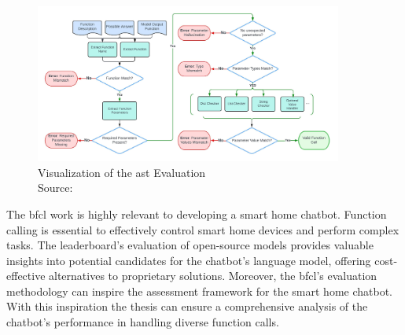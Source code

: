\begin{figure}[h]
  \centering
  \captionsetup{justification=centering}
  \includegraphics[width=0.9\textwidth]{graphics/bfcl-ast.jpeg}
  \caption{Visualization of the \gls{ast} Evaluation\\Source: \citet{berkeley-function-calling-leaderboard}}
  \label{fig:ast}
\end{figure}

The \gls{bfcl} work is highly relevant to developing a smart home chatbot. 
Function calling is essential to effectively control smart home devices and perform complex tasks. 
The leaderboard's evaluation of open-source models provides valuable insights into potential candidates for the chatbot's language model, offering cost-effective alternatives to proprietary solutions. 
Moreover, the \gls{bfcl}'s evaluation methodology can inspire the assessment framework for the smart home chatbot. 
With this inspiration the thesis can ensure a comprehensive analysis of the chatbot's performance in handling diverse function calls.
